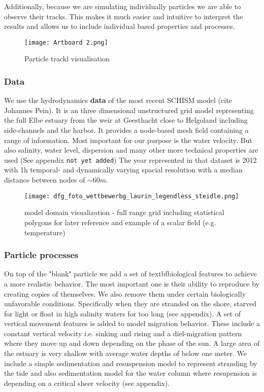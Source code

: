 Additionally, because we are simulating individually particles we are able to observe their tracks.
This makes it much easier and intuitive to interpret the results and allows us to include individual based properties and processes.

\begin{figure}
    \texttt{[image: Artboard 2.png]}
    \caption{Particle trackl visualisation}
\end{figure}

\subsubsection*{Data}
We use the hydrodynamics \textbf{data} of the most recent SCHISM model (cite Johannes Pein).
It is an three dimensional unstructured  grid model representing the full Elbe estuary from the weir at Geesthacht close to Helgoland including side-channels and the harbor.
It provides a node-based mesh field containing a range of information.
Most important for our purpose is the water velocity.
But also salinity, water level, dispersion and many other more technical properties are used (See appendix \texttt{not yet added})
The year represented in that dataset is 2012 with 1h temporal- and dynamically varying spacial resolution with a median distance between nodes of $\sim60m$.

\begin{figure}
    \texttt{[image: dfg\_foto\_wettbewerbg\_laurin\_legendless\_steidle.png]}
    \caption{model domain visualization - full range grid including statistical polygons for later reference and example of a scalar field (e.g. temperature)}
    \label{fig:statistial polygons}
\end{figure}

\subsubsection*{Particle processes}

On top of the "blank" particle we add a set of textbf{biological features} to achieve a more realistic behavior.
The most important one is their ability to reproduce by creating copies of themselves.
We also remove them under certain biologically unfavorable conditions. Specifically when they are stranded on the shore, starved for light or float in high salinity waters for too long (see appendix).
A set of vertical movement features is added to model migration behavior. 
These include a constant vertical velocity i.e. sinking and rising and a diel-migration pattern where they move up and down depending on the phase of the sun.
A large area of the estuary is very shallow with average water depths of below one meter. 
We include a simple sedimentation and resuspension model to represent stranding by the tide and also sedimentation model for the water column where resupension is depending on a critical sheer velocity (see appendix).

